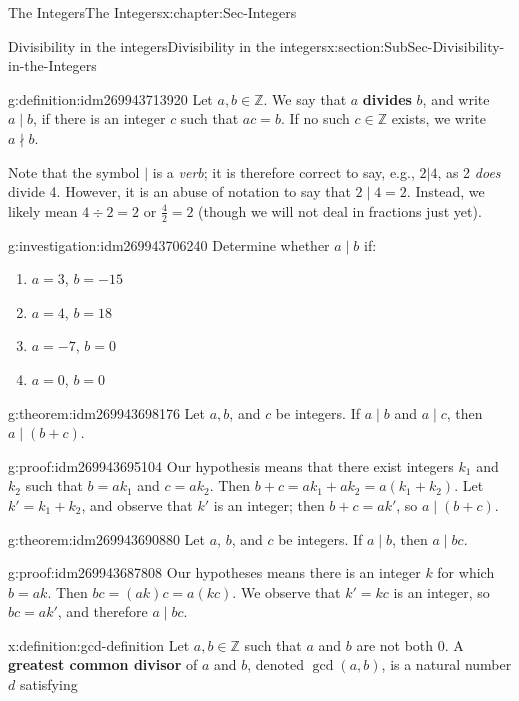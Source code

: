 \documentclass[oneside,10pt,]{book}
\newcommand{\terminology}[1]{\textbf{#1}}
\numberwithin{equation}{section}
\def\Z{{\mathbb Z}}
\begin{document}
\begin{chapterptx}{The Integers}{}{The Integers}{}{}{x:chapter:Sec-Integers}
\begin{sectionptx}{Divisibility in the integers}{}{Divisibility in the integers}{}{}{x:section:SubSec-Divisibility-in-the-Integers}
\begin{definition}{}{g:definition:idm269943713920}%
Let \(a,b\in \Z\). We say that \(a\) \terminology{divides} \(b\), and write \(a\mid b\), if there is an integer \(c\) such that \(ac = b\). If no such \(c\in \Z\) exists, we write \(a\nmid b\).%
\end{definition}
Note that the symbol \(|\) is a \emph{verb}; it is therefore correct to say, e.g., \(2|4\), as 2 \emph{does} divide 4. However, it is an abuse of notation to say that \(2\mid 4 = 2\). Instead, we likely mean \(4\div 2 = 2\) or \(\frac{4}{2} = 2\) (though we will not deal in fractions just yet).%
\begin{investigation}{}{g:investigation:idm269943706240}%
Determine whether \(a\mid b\) if:%
\begin{enumerate}
\item{}\(a = 3\), \(b = -15\)%
\item{}\(a = 4\), \(b = 18\)%
\item{}\(a = -7\), \(b = 0\)%
\item{}\(a = 0\), \(b = 0\)%
\end{enumerate}
%
\end{investigation}
\begin{theorem}{}{}{g:theorem:idm269943698176}%
Let \(a,b\), and \(c\) be integers. If \(a\mid b\) and \(a\mid c\), then \(a\mid (b+c)\).%
\end{theorem}
\begin{proofptx}{}{g:proof:idm269943695104}
Our hypothesis means that there exist integers \(k_1\) and \(k_2\) such that \(b = a k_1\) and \(c = a k_2\). Then \(b+c = a k_1 + a k_2 = a(k_1 + k_2)\). Let \(k' = k_1 + k_2\), and observe that \(k'\) is an integer; then \(b+c = a k'\), so \(a\mid (b+c)\).%
\end{proofptx}
\begin{theorem}{}{}{g:theorem:idm269943690880}%
Let \(a\), \(b\), and \(c\) be integers. If \(a\mid b\), then \(a\mid bc\).%
\end{theorem}
\begin{proofptx}{}{g:proof:idm269943687808}
Our hypotheses means there is an integer \(k\) for which \(b = ak\). Then \(bc = (ak)c = a(kc)\). We observe that \(k' = kc\) is an integer, so \(bc = ak'\), and therefore \(a\mid bc\).%
\end{proofptx}
\begin{definition}{}{x:definition:gcd-definition}%
Let \(a,b\in \Z\) such that \(a\) and \(b\) are not both 0. A \terminology{greatest common divisor} of \(a\) and \(b\), denoted \(\gcd(a,b)\), is a natural number \(d\) satisfying%

\end{definition}
\end{sectionptx}
\end{chapterptx}
\end{document}
